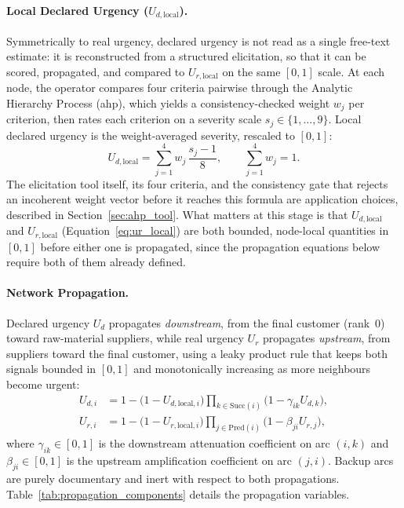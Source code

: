 \paragraph{Local Declared Urgency ($U_{d,\text{local}}$).}
Symmetrically to real urgency, declared urgency is not read as a single free-text estimate: it is reconstructed from a structured elicitation, so that it can be scored, propagated, and compared to $U_{r,\text{local}}$ on the same $[0,1]$ scale. At each node, the operator compares four criteria pairwise through the Analytic Hierarchy Process (\gls{ahp}), which yields a consistency-checked weight $w_j$ per criterion, then rates each criterion on a severity scale $s_j \in \{1, \ldots, 9\}$. Local declared urgency is the weight-averaged severity, rescaled to $[0,1]$:
\begin{equation}
    U_{d,\text{local}} = \sum_{j=1}^{4} w_j\,\frac{s_j - 1}{8}, \qquad \sum_{j=1}^{4} w_j = 1.
    \label{eq:ud_local}
\end{equation}
The elicitation tool itself, its four criteria, and the consistency gate that rejects an incoherent weight vector before it reaches this formula are application choices, described in Section~\ref{sec:ahp_tool}. What matters at this stage is that $U_{d,\text{local}}$ and $U_{r,\text{local}}$ (Equation~\ref{eq:ur_local}) are both bounded, node-local quantities in $[0,1]$ before either one is propagated, since the propagation equations below require both of them already defined.

\paragraph{Network Propagation.}
Declared urgency $U_d$ propagates \emph{downstream}, from the final customer (rank~0) toward raw-material suppliers, while real urgency $U_r$ propagates \emph{upstream}, from suppliers toward the final customer, using a leaky product rule that keeps both signals bounded in $[0,1]$ and monotonically increasing as more neighbours become urgent:
\begin{align}
    U_{d,i} &= 1 - \bigl(1 - U_{d,\text{local},i}\bigr) \prod_{k \in \text{Succ}(i)} \bigl(1 - \gamma_{ik} U_{d,k}\bigr), \label{eq:ud_prop} \\
    U_{r,i} &= 1 - \bigl(1 - U_{r,\text{local},i}\bigr) \prod_{j \in \text{Pred}(i)} \bigl(1 - \beta_{ji} U_{r,j}\bigr), \label{eq:ur_prop}
\end{align}
where $\gamma_{ik} \in [0,1]$ is the downstream attenuation coefficient on arc $(i,k)$ and $\beta_{ji} \in [0,1]$ is the upstream amplification coefficient on arc $(j,i)$. Backup arcs are purely documentary and inert with respect to both propagations. Table~\ref{tab:propagation_components} details the propagation variables.

